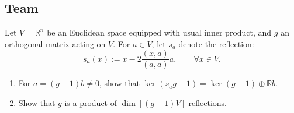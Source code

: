 \subsection*{Team}
\begin{exercise}
\label{algebra:2015:6}
Let $V = \mathbb{R}^n$ be an Euclidean space equipped with usual inner product, and $g$ an orthogonal matrix acting on $V$. For $a \in V$, let $s_a$ denote the reflection:
\[ s_a(x) := x - 2 \frac{(x, a)}{(a, a)} a, \qquad \forall x \in V. \]
\begin{enumerate}
    \item For $a = (g - 1)b \neq 0$, show that $\ker(s_a g - 1) = \ker(g - 1) \oplus \mathbb{R}b$.
    \item Show that $g$ is a product of $\dim[(g - 1)V]$ reflections.
\end{enumerate}
\end{exercise}

